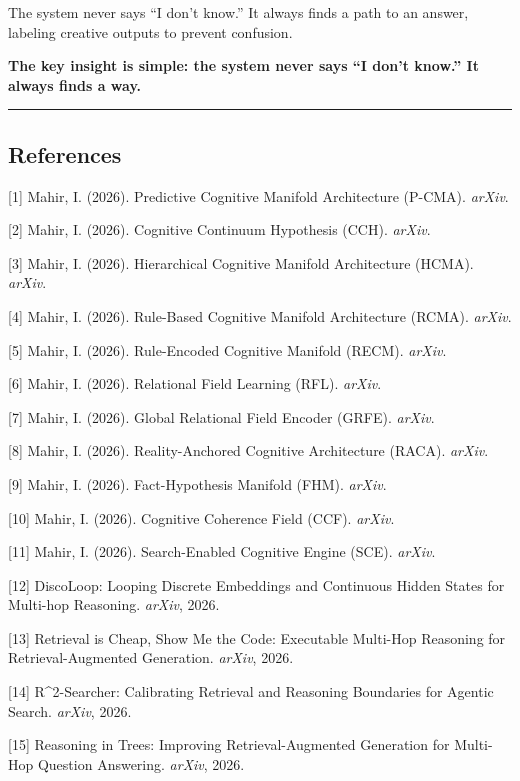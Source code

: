 \documentclass[
  11pt,
  a4paper,
]{article}
\begin{document}
The system never says ``I don't know.'' It always finds a path to an
answer, labeling creative outputs to prevent confusion.

\textbf{The key insight is simple: the system never says ``I don't
know.'' It always finds a way.}

\begin{center}\rule{0.5\linewidth}{0.5pt}\end{center}

\subsection{References}\label{references}

{[}1{]} Mahir, I. (2026). Predictive Cognitive Manifold Architecture
(P-CMA). \emph{arXiv}.

{[}2{]} Mahir, I. (2026). Cognitive Continuum Hypothesis (CCH).
\emph{arXiv}.

{[}3{]} Mahir, I. (2026). Hierarchical Cognitive Manifold Architecture
(HCMA). \emph{arXiv}.

{[}4{]} Mahir, I. (2026). Rule-Based Cognitive Manifold Architecture
(RCMA). \emph{arXiv}.

{[}5{]} Mahir, I. (2026). Rule-Encoded Cognitive Manifold (RECM).
\emph{arXiv}.

{[}6{]} Mahir, I. (2026). Relational Field Learning (RFL). \emph{arXiv}.

{[}7{]} Mahir, I. (2026). Global Relational Field Encoder (GRFE).
\emph{arXiv}.

{[}8{]} Mahir, I. (2026). Reality-Anchored Cognitive Architecture
(RACA). \emph{arXiv}.

{[}9{]} Mahir, I. (2026). Fact-Hypothesis Manifold (FHM). \emph{arXiv}.

{[}10{]} Mahir, I. (2026). Cognitive Coherence Field (CCF).
\emph{arXiv}.

{[}11{]} Mahir, I. (2026). Search-Enabled Cognitive Engine (SCE).
\emph{arXiv}.

{[}12{]} DiscoLoop: Looping Discrete Embeddings and Continuous Hidden
States for Multi-hop Reasoning. \emph{arXiv}, 2026.

{[}13{]} Retrieval is Cheap, Show Me the Code: Executable Multi-Hop
Reasoning for Retrieval-Augmented Generation. \emph{arXiv}, 2026.

{[}14{]} R\^{}2-Searcher: Calibrating Retrieval and Reasoning Boundaries
for Agentic Search. \emph{arXiv}, 2026.

{[}15{]} Reasoning in Trees: Improving Retrieval-Augmented Generation
for Multi-Hop Question Answering. \emph{arXiv}, 2026.
\end{document}
